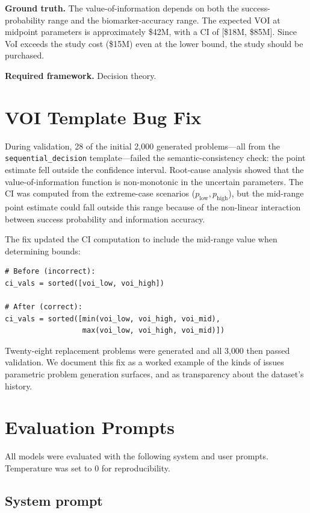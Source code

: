 \documentclass{article}
\begin{document}
\noindent\textbf{Ground truth.}
The value-of-information depends on both the success-probability range and the biomarker-accuracy range. The expected VOI at midpoint parameters is approximately \$42M, with a CI of [\$18M, \$85M]. Since VoI exceeds the study cost (\$15M) even at the lower bound, the study should be purchased.

\noindent\textbf{Required framework.} Decision theory.


\section{VOI Template Bug Fix}
\label{sec:voi_bug}

During validation, 28 of the initial 2{,}000 generated problems---all from the \texttt{sequential\_decision} template---failed the semantic-consistency check: the point estimate fell outside the confidence interval. Root-cause analysis showed that the value-of-information function is non-monotonic in the uncertain parameters. The CI was computed from the extreme-case scenarios ($p_\text{low}, p_\text{high}$), but the mid-range point estimate could fall outside this range because of the non-linear interaction between success probability and information accuracy.

The fix updated the CI computation to include the mid-range value when determining bounds:
\begin{verbatim}
# Before (incorrect):
ci_vals = sorted([voi_low, voi_high])

# After (correct):
ci_vals = sorted([min(voi_low, voi_high, voi_mid),
                  max(voi_low, voi_high, voi_mid)])
\end{verbatim}

Twenty-eight replacement problems were generated and all 3{,}000 then passed validation. We document this fix as a worked example of the kinds of issues parametric problem generation surfaces, and as transparency about the dataset's history.


\section{Evaluation Prompts}
\label{app:prompts}

All models were evaluated with the following system and user prompts. Temperature was set to 0 for reproducibility.

\subsection*{System prompt}
\end{document}
